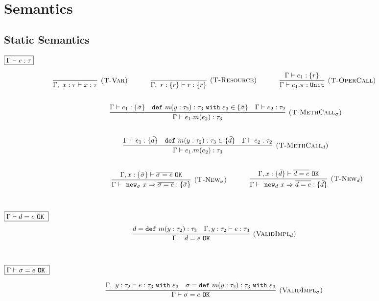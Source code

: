 \documentclass{llncs}
\newcommand{\keywadj}[1]{\mathtt{#1}}
\newcommand{\keyw}[1]{\keywadj{#1}~}
\begin{document}
\section{Semantics}

\subsection{Static Semantics}

\noindent
$\fbox{$\Gamma \vdash e : \tau$}$

\[
\begin{array}{c}
\infer[\textsc{(T-Var)}]
	{\Gamma,~x : \tau \vdash x : \tau}
	{}
~~~~~~~~~~
\infer[\textsc{(T-Resource)}]
	{\Gamma,~r : \{ r \} \vdash r : \{ r \}}
	{}
~~~~~~~~~~
\infer[\textsc{(T-OperCall)}]
	{\Gamma \vdash e_1.\pi : \keywadj{Unit}}
	{\Gamma \vdash e_1 : \{ r \}} \\[5ex]
~~~~~~~~~~
\infer[\textsc{(T-MethCall$_\sigma$)}]
	{\Gamma \vdash e_1.m(e_2) : \tau_3}
	{\Gamma \vdash e_1 : \{ \bar \sigma \} & \keyw{def} m(y : \tau_2) : \tau_3~\keyw{with} \varepsilon_3 \in \{ \bar \sigma \} &  \Gamma \vdash e_2 : \tau_2 }\\[5ex]
~~~~~~~~~~
\infer[\textsc{(T-MethCall$_d$)}]
	{\Gamma \vdash e_1.m(e_2) : \tau_3}
	{\Gamma \vdash e_1 : \{ \bar d\} & \keyw{def} m(y : \tau_2) : \tau_3 \in \{ \bar d \} &  \Gamma \vdash e_2 : \tau_2}\\[5ex]
~~~~~~~~~~

~~~~~~~~~~
\infer[\textsc{(T-New$_\sigma$)}]
	{\Gamma \vdash~\keywadj{new}_\sigma~x \Rightarrow \overline{\sigma = e} : \{ \bar \sigma \}}
	{\Gamma, x : \{ \bar \sigma \} \vdash \overline{\sigma = e}~\keywadj{OK}}
~~~~~~~~~~
\infer[\textsc{(T-New$_d$)}]
	{\Gamma \vdash~\keywadj{new}_d~x \Rightarrow \overline{d = e} : \{ \bar d \}}
	{\Gamma, x : \{ \bar d \} \vdash \overline{d = e}~\keywadj{OK}}\\[5ex]
\end{array}
\]

\noindent
$\fbox{$\Gamma \vdash d = e~\keyw{OK}$}$
\[
\begin{array}{c}
\infer[\textsc{(ValidImpl$_d$)}]
	{\Gamma \vdash d = e~\keywadj{OK}}
	{d = \keyw{def} m(y : \tau_2) : \tau_3 & \Gamma, y : \tau_2 \vdash e : \tau_3}
	\\[5ex]
\end{array}
\]

\noindent
$\fbox{$\Gamma \vdash \sigma = e~\keyw{OK}$}$

\[
\begin{array}{c}
\infer[\textsc{(ValidImpl$_\sigma$)}]
	{\Gamma \vdash \sigma = e~\keywadj{OK}}
	{\Gamma,~y:\tau_2 \vdash e: \tau_3~\keyw{with} \varepsilon_3 & \sigma = \keyw{def} m(y:\tau_2):\tau_3~\keyw{with} \varepsilon_3} \\[5ex]
\end{array}
\]
\end{document}
